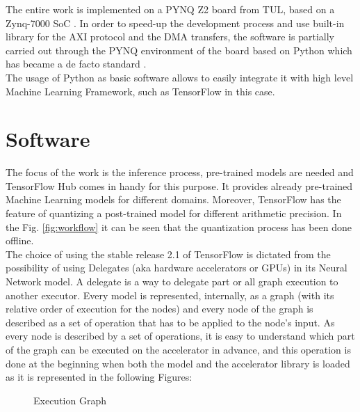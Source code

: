 \newpage
The entire work is implemented on a PYNQ Z2 board from TUL, based on a Zynq-7000 SoC \cite{paper:31}. In order to speed-up the development process and use built-in library for the AXI protocol and the DMA transfers, the software is partially carried out through the PYNQ environment of the board \cite{WEBSITE:2} based on Python which has became a de facto standard \cite{paper:37}. \\
The usage of Python as basic software allows to easily integrate it with high level Machine Learning Framework, such as TensorFlow in this case. 
\newpage
\section{Software}

The focus of the work is the inference process, pre-trained models are needed and TensorFlow Hub \cite{WEBSITE:5} comes in handy for this purpose. It provides already pre-trained Machine Learning models for different domains. Moreover, TensorFlow has the feature of quantizing a post-trained model for different arithmetic precision. In the Fig. \ref{fig:workflow} it can be seen that the quantization process has been done offline.\\
The choice of using the stable release 2.1 of TensorFlow is dictated from the possibility of using Delegates (aka hardware accelerators or GPUs) in its Neural Network model. A delegate is a way to delegate part or all graph execution to another executor. Every model is represented, internally, as a graph (with its relative order of execution for the nodes) and every node of the graph is described as a set of operation that has to be applied to the node's input. As every node is described by a set of operations, it is easy to understand which part of the graph can be executed on the accelerator in advance, and this operation is done at the beginning when both the model and the accelerator library is loaded as it is represented in the following Figures:
\begin{figure}[!htbp]
\captionsetup{justification=centering}
    \centering
    \qquad
    \centering
    \caption{Execution Graph}%
    \label{fig:execgraph}%
\end{figure}
